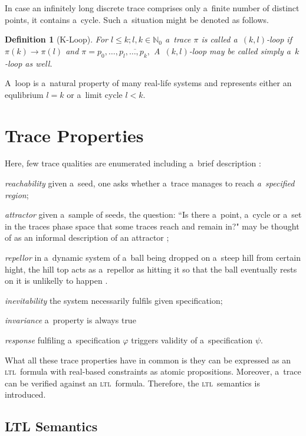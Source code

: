 \documentclass[12pt,oneside,draft]{fithesis}
\newcommand{\ltl}{\textsc{ltl}~}
\newcommand{\mNatural}{\mathbb{N}}
\newtheorem{mydef}{Definition}
\begin{document}
In case an infinitely long discrete trace comprises only a~finite number
of distinct points, it contains a~cycle. Such a~situation might be
denoted as follows\cite{biere}.
\begin{mydef}[K-Loop]
For $l\leq k;l,k\in\mNatural_0$ a~trace $\pi$ is called a~$(k,l)$-loop
if $\pi(k)\rightarrow\pi(l)$ and
$\pi=p_0,\dotsc,\overline{p_{l},\dotsc,p_{k},}$
A~$(k,l)$-loop may be called simply a~$k$-loop as well. 
\end{mydef}
A~loop is a~natural property of many real-life systems and represents
either an equlibrium $l=k$ or a~limit
cycle $l<k$\cite{sven}.

\section{Trace Properties}
Here, few trace qualities are enumerated including a~brief
description \cite{sven}\cite{rizk}:
\begin{inparaenum}
	\item\emph{reachability} given a~seed, one asks whether a~trace
		manages to reach \emph{a~specified region};
	\item\emph{attractor} given a~sample of seeds, the question:
		``Is there a~point, a~cycle or a~set in the traces phase space
		that some traces reach and remain in?" may be thought of as an
		informal description of an attractor \cite{wiki-atractor};
	\item\emph{repellor} in a~dynamic system of a~ball being dropped on
		a~steep hill from certain hight, the hill top acts as a~repellor
		as hitting it so that the ball eventually rests on it is
		unlikelly to happen \cite{wiki-repellor}.
	\item\emph{inevitability} the system necessarily fulfils given
		specification;
	\item\emph{invariance} a~property is always true
	\item\emph{response} fulfiling a~specification $\varphi$ triggers
		validity of a~specification $\psi$.
\end{inparaenum}

What all these trace properties have in common is they can be expressed
as an \ltl formula with real-based constraints as atomic
propositions\cite{sven}. Moreover, a~trace can be verified against
an \ltl formula. Therefore, the \ltl semantics is introduced.

\subsection{LTL Semantics}
\end{document}
